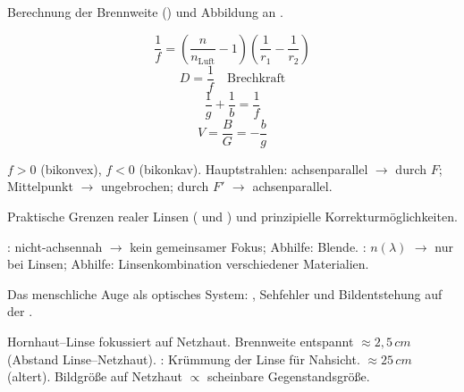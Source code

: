 \begin{runintext}
Berechnung der Brennweite () und Abbildung an .
\end{runintext}
\begin{formulabox}
\[ \frac{1}{f} = \left(\frac{n}{n_{\mathrm{Luft}}}-1\right)\left(\frac{1}{r_1}-\frac{1}{r_2}\right) \]
\[ D = \frac{1}{f} \quad \text{Brechkraft} \]
\formulasep
\[ \frac{1}{g} + \frac{1}{b} = \frac{1}{f} \]
\[ V = \frac{B}{G} = -\frac{b}{g} \]
\end{formulabox}
\begin{runintext}
$f>0$  (bikonvex), $f<0$  (bikonkav). Hauptstrahlen: achsenparallel $\to$ durch $F$; Mittelpunkt $\to$ ungebrochen; durch $F'$ $\to$ achsenparallel.
\end{runintext}

\begin{runintext}
Praktische Grenzen realer Linsen ( und ) und prinzipielle Korrekturmöglichkeiten.
\end{runintext}
\begin{runintext}
: nicht-achsennah $\to$ kein gemeinsamer Fokus; Abhilfe: Blende. : $n(\lambda)$ $\to$ nur bei Linsen; Abhilfe: Linsenkombination verschiedener Materialien.
\end{runintext}

\begin{runintext}
Das menschliche Auge als optisches System: , Sehfehler und Bildentstehung auf der .
\end{runintext}
\begin{runintext}
Hornhaut–Linse fokussiert auf Netzhaut. Brennweite entspannt $\approx 2{,}5\,\si{cm}$ (Abstand Linse–Netzhaut). : Krümmung der Linse für Nahsicht.  $\approx 25\,\si{cm}$ (altert). Bildgröße auf Netzhaut $\propto$ scheinbare Gegenstandsgröße.
\end{runintext}

